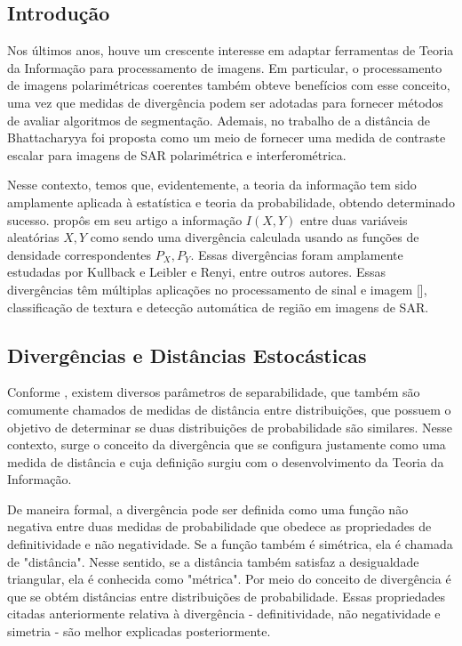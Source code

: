 \documentclass[12pt]{article}
\begin{document}
\subsection{Introdução}

Nos últimos anos, houve um crescente interesse em adaptar ferramentas de Teoria da Informação para processamento de imagens. Em particular, o processamento de imagens polarimétricas coerentes também obteve benefícios com esse conceito, uma vez que medidas de divergência podem ser adotadas para fornecer métodos de avaliar algoritmos de segmentação. Ademais, no trabalho de \citet{Goudail:04} a distância de Bhattacharyya foi proposta como um meio de fornecer uma medida de contraste escalar para imagens de SAR polarimétrica e interferométrica.

Nesse contexto, temos que, evidentemente, a teoria da informação tem sido amplamente aplicada à estatística e teoria da probabilidade, obtendo determinado sucesso. \citet{Shannon48} propôs em seu artigo a informação $I(X,Y)$ entre duas variáveis aleatórias $X, Y$ como sendo uma divergência calculada usando as funções de densidade correspondentes $P_{X}, P_{Y}$. Essas divergências foram amplamente estudadas por Kullback e Leibler e Renyi, entre outros autores. Essas divergências têm múltiplas aplicações no processamento de sinal e imagem [\citet{Aviyente}], classificação de textura e detecção automática de região em imagens de SAR.


\subsection{Divergências e Distâncias Estocásticas}

Conforme \citet{tese_abraao}, existem diversos parâmetros de separabilidade, que também são comumente chamados de medidas de distância entre distribuições, que possuem o objetivo de determinar se duas distribuições de probabilidade são similares. Nesse contexto, surge o conceito da divergência que se configura justamente como uma medida de distância e cuja definição surgiu com o desenvolvimento da Teoria da Informação. 

De maneira formal, a divergência pode ser definida como uma função não negativa entre duas medidas de probabilidade que obedece as propriedades de definitividade e não negatividade. Se a função também é simétrica, ela é chamada de "distância". Nesse sentido, se a distância também satisfaz a desigualdade triangular, ela é conhecida como "métrica". Por meio do conceito de divergência é que se obtém distâncias entre distribuições de probabilidade. Essas propriedades citadas anteriormente relativa à divergência - definitividade, não negatividade e simetria - são melhor explicadas posteriormente.
\end{document}
